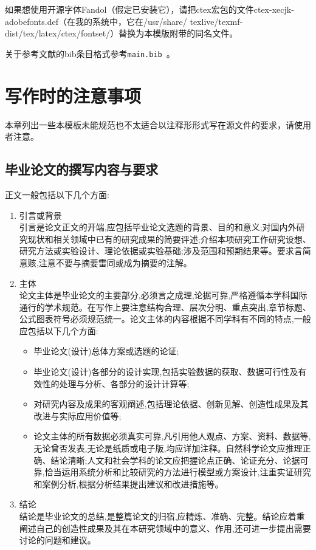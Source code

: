 ﻿\documentclass{sysuthesis}
\begin{document}
如果想使用开源字体{\ttfamily Fandol}（假定已安装它），请把{\ttfamily ctex}宏包的文件{\ttfamily ctex-xecjk-adobefonts.def}（在我的系统中，它在{\ttfamily /usr/share/ texlive/texmf-dist/tex/latex/ctex/fontset/}）替换为本模版附带的同名文件。

关于参考文献的bib条目格式参考\texttt{main.bib}~\cite{article}\cite{book}\cite{phdthesis}\cite{inproc}\cite{masterthesis}\cite{manual}\cite{report}\cite{database}\cite{software}\cite{standard}\cite{newspaper}\cite{patent}。

\chapter{写作时的注意事项}

本章列出一些本模板未能规范也不太适合以注释形形式写在源文件的要求，请使用者注意。

\section{毕业论文的撰写内容与要求}

正文一般包括以下几个方面:

\begin{enumerate}
	\item 引言或背景\\
		引言是论文正文的开端,应包括毕业论文选题的背景、目的和意义;对国内外研究现状和相关领域中已有的研究成果的简要评述;介绍本项研究工作研究设想、研究方法或实验设计、理论依据或实验基础;涉及范围和预期结果等。要求言简意赅,注意不要与摘要雷同或成为摘要的注解。
	\item 主体\\
		论文主体是毕业论文的主要部分,必须言之成理,论据可靠,严格遵循本学科国际通行的学术规范。在写作上要注意结构合理、层次分明、重点突出,章节标题、公式图表符号必须规范统一。论文主体的内容根据不同学科有不同的特点,一般应包括以下几个方面:
		\begin{itemize}
			\item 毕业论文(设计)总体方案或选题的论证;
			\item 毕业论文(设计)各部分的设计实现,包括实验数据的获取、数据可行性及有效性的处理与分析、各部分的设计计算等;
			\item 对研究内容及成果的客观阐述,包括理论依据、创新见解、创造性成果及其改进与实际应用价值等;
			\item 论文主体的所有数据必须真实可靠,凡引用他人观点、方案、资料、数据等,无论曾否发表,无论是纸质或电子版,均应详加注释。自然科学论文应推理正确、结论清晰;人文和社会学科的论文应把握论点正确、论证充分、论据可靠,恰当运用系统分析和比较研究的方法进行模型或方案设计,注重实证研究和案例分析,根据分析结果提出建议和改进措施等。
		\end{itemize}
	\item 结论\\
		结论是毕业论文的总结,是整篇论文的归宿,应精炼、准确、完整。结论应着重阐述自己的创造性成果及其在本研究领域中的意义、作用,还可进一步提出需要讨论的问题和建议。
\end{enumerate}
\end{document}
